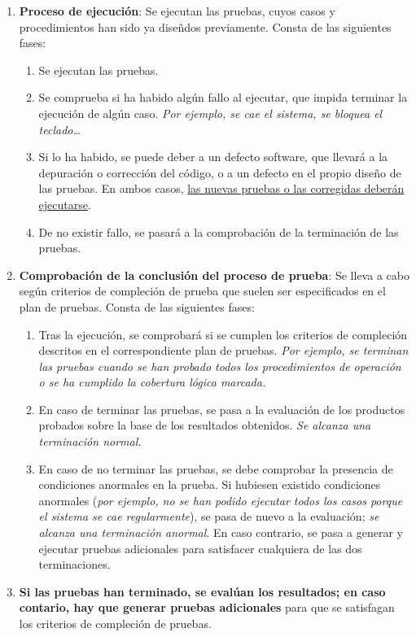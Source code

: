 \begin{enumerate}
    \item \textbf{Proceso de ejecución}: Se ejecutan las pruebas, cuyos casos y procedimientos han sido ya diseñdos previamente. Consta de las siguientes fases:
    \begin{enumerate}
        \item Se ejecutan las pruebas.
        \item Se comprueba si ha habido algún fallo al ejecutar, que impida terminar la ejecución de algún caso. \textit{Por ejemplo, se cae el sistema, se bloquea el teclado\ldots}
        \item Si lo ha habido, se puede deber a un defecto software, que llevará a la depuración o corrección del código, o a un defecto en el propio diseño de las pruebas. En ambos casos, \uline{las nuevas pruebas o las corregidas deberán ejecutarse}.
        \item De no existir fallo, se pasará a la comprobación de la terminación de las pruebas.
    \end{enumerate}

    \item \textbf{Comprobación de la conclusión del proceso de prueba}: Se lleva a cabo según criterios de compleción de prueba que suelen ser especificados en el plan de pruebas. Consta de las siguientes fases:
    \begin{enumerate}
        \item Tras la ejecución, se comprobará si se cumplen los criterios de compleción descritos en el correspondiente plan de pruebas. \textit{Por ejemplo, se terminan las pruebas cuando se han probado todos los procedimientos de operación o se ha cumplido la cobertura lógica marcada.}
        \item En caso de terminar las pruebas, se pasa a la evaluación de los productos probados sobre la base de los resultados obtenidos. \textit{Se alcanza una terminación normal.}
        \item En caso de no terminar las pruebas, se debe comprobar la presencia de condiciones anormales en la prueba. Si hubiesen existido condiciones anormales (\textit{por ejemplo, no se han podido ejecutar todos los casos porque el sistema se cae regularmente}), se pasa de nuevo a la evaluación; \textit{se alcanza una terminación anormal}. En caso contrario, se pasa a generar y ejecutar pruebas adicionales para satisfacer cualquiera de las dos terminaciones.
    \end{enumerate}
    \item \textbf{Si las pruebas han terminado, se evalúan los resultados; en caso contario, hay que generar pruebas adicionales} para que se satisfagan los criterios de compleción de pruebas.
\end{enumerate}

